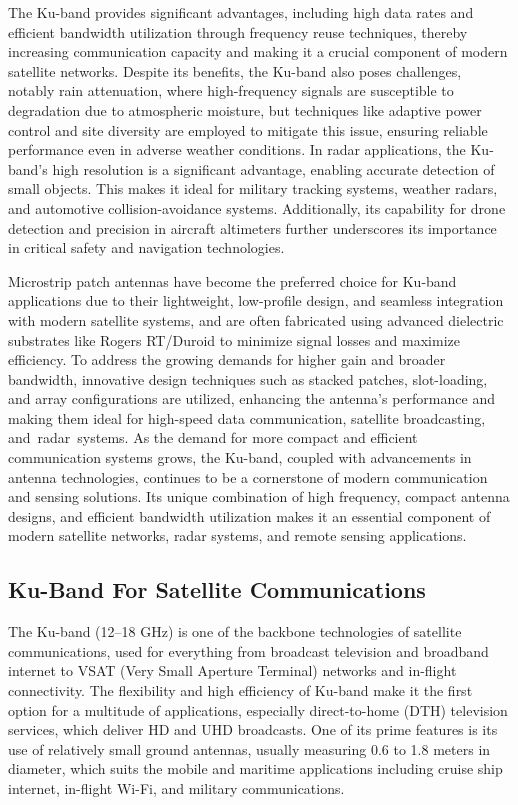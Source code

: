 \documentclass[12pt]{article}
\begin{document}
\par The Ku-band provides significant advantages, including high data rates and efficient bandwidth utilization through frequency reuse techniques, thereby increasing communication capacity and making it a crucial component of modern satellite networks. Despite its benefits, the Ku-band also poses challenges, notably rain attenuation, where high-frequency signals are susceptible to degradation due to atmospheric moisture, but techniques like adaptive power control and site diversity are employed to mitigate this issue, ensuring reliable performance even in adverse weather conditions. In radar applications, the Ku-band's high resolution is a significant advantage, enabling accurate detection of small objects. This makes it ideal for military tracking systems, weather radars, and automotive collision-avoidance systems. Additionally, its capability for drone detection and precision in aircraft altimeters further underscores its importance in critical safety and navigation technologies.\\

\par Microstrip patch antennas have become the preferred choice for Ku-band applications due to their lightweight, low-profile design, and seamless integration with modern satellite systems, and are often fabricated using advanced dielectric substrates like Rogers RT/Duroid to minimize signal losses and maximize efficiency. To address the growing demands for higher gain and broader bandwidth, innovative design techniques such as stacked patches, slot-loading, and array configurations are utilized, enhancing the antenna's performance and making them ideal for high-speed data communication, satellite broadcasting, and radar systems. As the demand for more compact and efficient communication systems grows, the Ku-band, coupled with advancements in antenna technologies, continues to be a cornerstone of modern communication and sensing solutions. Its unique combination of high frequency, compact antenna designs, and efficient bandwidth utilization makes it an essential component of modern satellite networks, radar systems, and remote sensing applications.

\subsection{Ku-Band For Satellite Communications}
\par The Ku-band (12–18 GHz) is one of the backbone technologies of satellite communications, used for everything from broadcast television and broadband internet to VSAT (Very Small Aperture Terminal) networks and in-flight connectivity. The flexibility and high efficiency of Ku-band make it the first option for a multitude of applications, especially direct-to-home (DTH) television services, which deliver HD and UHD broadcasts. One of its prime features is its use of relatively small ground antennas, usually measuring 0.6 to 1.8 meters in diameter, which suits the mobile and maritime applications including cruise ship internet, in-flight Wi-Fi, and military communications.\\
\end{document}
